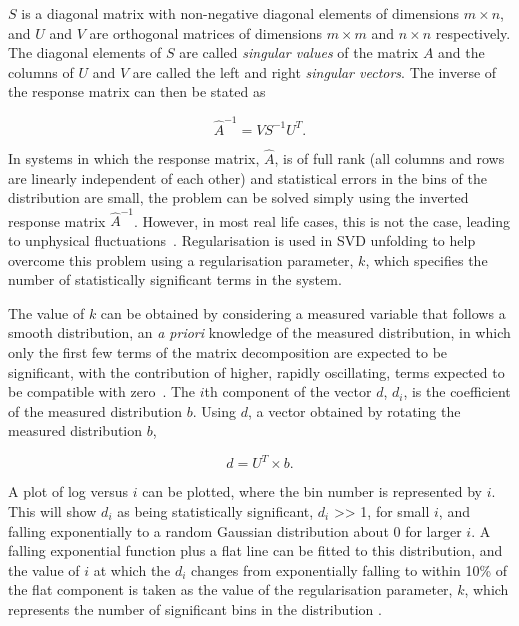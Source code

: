 $S$ is a diagonal matrix with non-negative diagonal elements of dimensions $m \times n$, and $U$ and $V$ are
orthogonal matrices of dimensions $m \times m$ and $n \times n$ respectively. The diagonal elements of $S$ are
called \textit{singular values} of the matrix $A$ and the columns of $U$ and $V$ are called the left and right
\textit{singular vectors}. The inverse of the response matrix can then be stated as

\begin{equation}
\hat{A}^{-1} = VS^{-1}U^{T}.
\label{eq:inverse_response}
\end{equation}

In systems in which the response matrix, $\hat{A}$, is of full rank (all columns and rows are linearly
independent of each other) and statistical errors in the bins of the distribution are small, the problem can
be solved simply using the inverted response matrix $\hat{A}^{-1}$. However, in most real life cases, this is
not the case, leading to unphysical fluctuations~\cite{Hocker:1995kb}. Regularisation is used in SVD unfolding
to help overcome this problem using a regularisation parameter, $k$, which specifies the number of
statistically significant terms in the system.

The value of $k$ can be obtained by considering a measured variable that follows a smooth
distribution, an \textit{a priori} knowledge of the measured distribution, in which only the first few terms
of the matrix decomposition are expected to be significant, with the contribution of higher, rapidly
oscillating, terms expected to be compatible with zero~\cite{Hocker:1995kb}. The $i$th component of the vector
$d$, $d_{i}$, is the coefficient of the measured distribution $b$. Using $d$, a vector obtained by rotating
the measured distribution $b$,

\begin{equation}
d = U^{T}\times{b}.
\label{eq:d}
\end{equation}

A plot of log versus $i$ can be plotted, where the bin number is represented by $i$. This will show
$d_{i}$ as being statistically significant, \ie $d_{i}$ >> 1, for small $i$, and falling exponentially to a
random Gaussian distribution about 0 for larger $i$. A falling exponential function plus a flat line can be
fitted to this distribution, and the value of $i$ at which the $d_{i}$ changes from exponentially falling to
within 10\% of the flat component is taken as the value of the regularisation parameter, $k$, which represents
the number of significant bins in the distribution \cite{Hocker:1995kb}.

